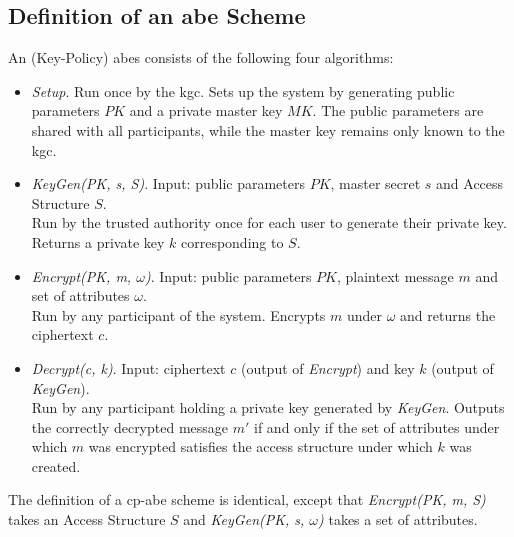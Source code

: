 \subsection{Definition of an \acrshort{abe} Scheme}


\begin{definition}
    An (Key-Policy) \Acrlong{abes} consists of the following four algorithms:~\cite{goyal_attribute-based_2006}
    \begin{itemize}
        \item \emph{Setup}. Run once by the \acrfull{kgc}. Sets up the system by generating public parameters $PK$ and a private master key $MK$. The public parameters are shared with all participants, while the master key remains only known to the \acrshort{kgc}.
        \item \emph{KeyGen(PK, s, S)}. Input: public parameters $PK$, master secret $s$ and Access Structure $S$.\\
        Run by the trusted authority once for each user to generate their private key. Returns a private key $k$ corresponding to $S$.
        \item \emph{Encrypt(PK, m, $\omega$)}. Input: public parameters $PK$, plaintext message $m$ and set of attributes $\omega$.\\
        Run by any participant of the system. Encrypts $m$ under $\omega$ and returns the ciphertext $c$.
        \item \emph{Decrypt(c, k)}. Input: ciphertext $c$ (output of \emph{Encrypt}) and key $k$ (output of \emph{KeyGen}).\\
        Run by any participant holding a private key generated by \emph{KeyGen}. Outputs the correctly decrypted message $m'$ if and only if the set of attributes under which $m$ was encrypted satisfies the access structure under which $k$ was created.
    \end{itemize}
\end{definition}

The definition of a \acrshort{cp-abe} scheme is identical, except that \emph{Encrypt(PK, m, S)} takes an Access Structure $S$ and \emph{KeyGen(PK, s, $\omega$)} takes a set of attributes.

